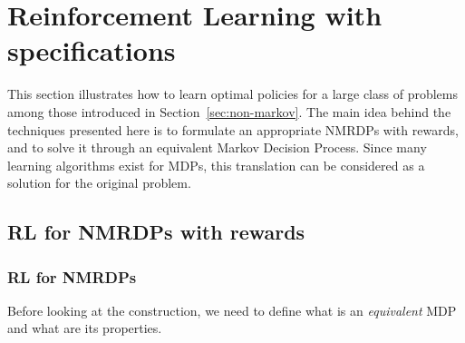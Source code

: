 \section[Reinforcement Learning with LDLf specifications]%
{Reinforcement Learning with \ldl{} specifications}

\label{sec:non-markov-solutions}

This section illustrates how to learn optimal policies for a large class of
problems among those introduced in Section~\ref{sec:non-markov}. The main idea
behind the techniques presented here is to formulate an appropriate NMRDPs
with \ldl{} rewards, and to solve it through an equivalent Markov Decision
Process. Since many learning algorithms exist for MDPs, this translation can
be considered as a solution for the original problem.


\subsection[RL for NMRDPs with LDLf rewards]%
{RL for NMRDPs with \ldl{} rewards}

\label{sec:nmrdp-solution}

\subsubsection*{RL for NMRDPs}

Before looking at the construction, we need to define what is an
\emph{equivalent} MDP and what are its properties.

